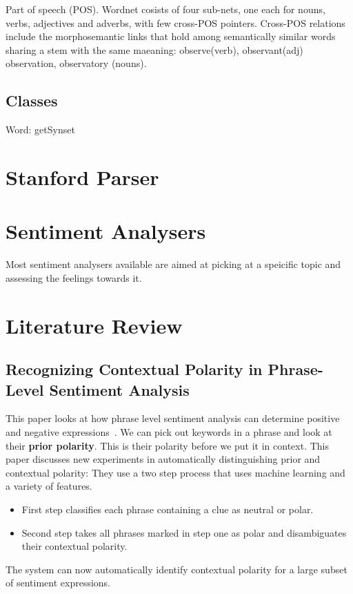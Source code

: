 Part of speech (POS). Wordnet cosists of four sub-nets, one each for nouns, verbs, adjectives and adverbs, with few cross-POS pointers. Cross-POS relations include the morphosemantic links that hold among semantically similar words sharing a stem with the same maeaning: observe(verb), observant(adj) observation, observatory (nouns). 


\subsection{Classes}
Word: 
getSynset

\section{Stanford Parser}

\section{Sentiment Analysers}
Most sentiment analysers available are aimed at picking at a speicific topic and assessing the feelings towards it. 

\section{Literature Review}
\subsection{Recognizing Contextual Polarity in Phrase-Level Sentiment Analysis}
This paper looks at how phrase level sentiment analysis can determine positive and negative expressions~\cite{phraselevelsentimentanalysis}. 
We can pick out keywords in a phrase and look at their {\bf prior polarity}. This is their polarity before we put it in context. This paper discusses new experiments in automatically distinguishing prior and contextual polarity: They use a two step process that uses machine learning and a variety of features. 
\begin{itemize}
\item First step classifies each phrase containing a clue as neutral or polar.
\item Second step takes all phrases marked in step one as polar and disambiguates their contextual polarity.
\end{itemize}
The system can now automatically identify contextual polarity for a large subset of sentiment expressions.
